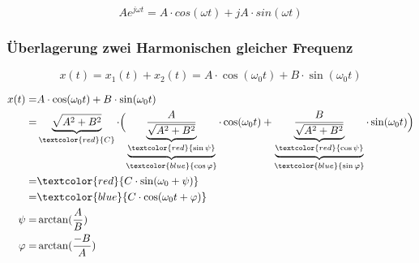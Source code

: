 \begin{equation}
    Ae^{j\omega t}=A \cdot cos(\omega t)+jA \cdot sin(\omega t)
\end{equation}




\subsubsection{\textbf{Überlagerung zwei Harmonischen gleicher Frequenz}}
\begin{equation}
    x(t)=x_{1}(t)+x_{2}(t)=A \cdot \cos(\omega_{0}t)+B \cdot \sin(\omega_{0}t)
\end{equation}


\begin{equation}
\begin{split}
     x(t)=& A \cdot \cos (\omega_{0}t)+B \cdot \sin(\omega_{0}t)\\
         =& \underbrace{\sqrt{A^{2}+B^{2}}}_{\textcolor{red}{C} }   \cdot \Bigl(\underbrace{\underbrace{\frac{A}{\sqrt{A^{2}+B^{2}}}}_{\textcolor{red}{\sin \psi} }}_{\textcolor{blue}{\cos \varphi} }   \cdot \cos(\omega_{0}t)+\underbrace{\underbrace{\frac{B}{\sqrt{A^{2}+B^{2}}}}_{\textcolor{red}{\cos\psi}}}_{\textcolor{blue}{\sin \varphi}}  \cdot \sin(\omega_{0}t )\Bigr)  \\
         =& \textcolor{red}{C \cdot \sin(\omega_{0}+\psi)}\\
         =& \textcolor{blue}{C \cdot \cos(\omega_{0}t+\varphi)}\\
     \psi=&\arctan (\dfrac{A}{B})\\
  \varphi=&\arctan (\dfrac{-B}{A})   
\end{split}
\end{equation}

